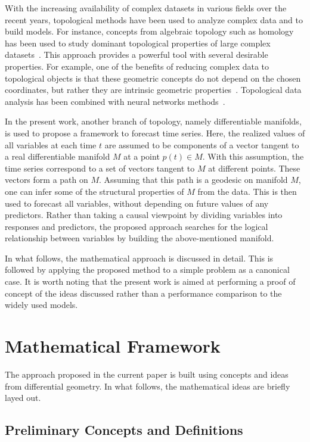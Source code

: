 \documentclass[a4paper,11pt]{elsarticle}
\begin{document}
With the increasing availability of complex datasets in various fields
over the recent years, topological methods have been used to analyze
complex data and to build models. For instance, concepts from
algebraic topology such as homology has been used to study dominant
topological properties of large complex datasets~\cite{carlsson-2009,
  bubenik-2015, wasserman-2018}. This approach provides a powerful
tool with several desirable properties. For example, one of the
benefits of reducing complex data to topological objects is that these
geometric concepts do not depend on the chosen coordinates, but rather
they are intrinsic geometric
properties~\cite{carlsson-2009}. Topological data analysis has been
combined with neural networks methods~\cite{carlsson-gabrielsson-2020}.

In the present work, another branch of topology, namely differentiable
manifolds, is used to propose a framework to forecast time
series. Here, the realized values of all variables at each time $t$
are assumed to be components of a vector tangent to a real
differentiable manifold $M$ at a point $p(t) \in M$. With this
assumption, the time series correspond to a set of vectors tangent to
$M$ at different points. These vectors form a path on $M$. Assuming
that this path is a geodesic on manifold $M$, one can infer some of
the structural properties of $M$ from the data. This is then used to
forecast all variables, without depending on future values of any
predictors. Rather than taking a causal viewpoint by dividing
variables into responses and predictors, the proposed approach
searches for the logical relationship between variables by building
the above-mentioned manifold.

In what follows, the mathematical approach is discussed in detail. This
is followed by applying the proposed method to a simple problem as a
canonical case. It is worth noting that the present work is aimed at
performing a proof of concept of the ideas discussed rather than
a performance comparison to the widely used models.

\section{Mathematical Framework}
\label{section:framework}

The approach proposed in the current paper is built using concepts and
ideas from differential geometry. In what follows, the mathematical
ideas are briefly layed out.

\subsection{Preliminary Concepts and Definitions}
\label{subsection:definitions}
\end{document}
